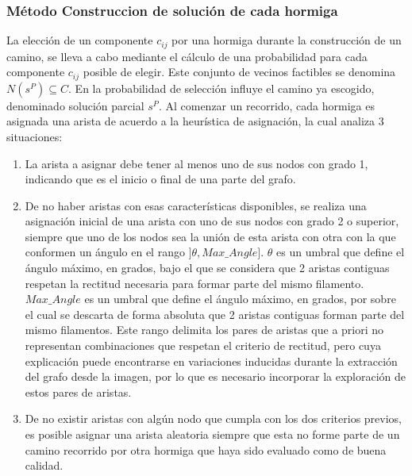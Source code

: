 \subsubsection{M\'etodo Construccion de soluci\'on de cada hormiga}
La elecci\'on de un componente $c_{ij}$ por una hormiga durante la construcci\'on de un camino,
se lleva a cabo mediante el c\'alculo de una probabilidad para cada componente $c_{ij}$ posible de elegir. Este conjunto de vecinos factibles se denomina $N(s^{P}) \subseteq C$. En la probabilidad de selecci\'on influye el camino ya escogido, denominado soluci\'on parcial $s^{P}$. Al comenzar un recorrido, cada hormiga es asignada una arista de acuerdo a la heur\'istica de asignaci\'on, la cual analiza 3 situaciones:
\begin{enumerate}
\item La arista a asignar debe tener al menos uno de sus nodos con grado 1, indicando que es el inicio o final de una parte del grafo.

\item De no haber aristas con esas caracter\'isticas disponibles, se realiza una asignaci\'on inicial de una arista con uno de sus nodos con grado 2 o superior, siempre que uno de los nodos sea la uni\'on de esta arista con otra con la que conformen un \'angulo en el rango $]\theta, Max\_Angle]$. $\theta$ es un umbral que define el \'angulo m\'aximo, en grados, bajo el que se considera que 2 aristas contiguas respetan la rectitud necesaria para formar parte del mismo filamento. $Max\_Angle$ es un umbral que define el \'angulo m\'aximo, en grados, por sobre el cual se descarta de forma absoluta que 2 aristas contiguas forman parte del mismo filamentos. Este rango delimita los pares de aristas que a priori no representan combinaciones que respetan el criterio de rectitud, pero cuya explicaci\'on puede encontrarse en variaciones inducidas durante la extracci\'on del grafo desde la imagen, por lo que es necesario incorporar la exploraci\'on de estos pares de aristas.

\item De no existir aristas con alg\'un nodo que cumpla con los dos criterios previos, es posible asignar una arista aleatoria siempre que esta no forme parte de un camino recorrido por otra hormiga que haya sido evaluado como de buena calidad.
\end{enumerate}

